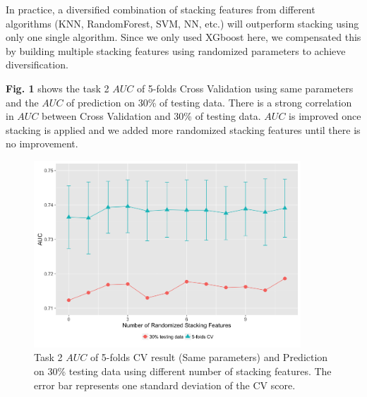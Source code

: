 \documentclass[a4paper]{llncs}
\makeatletter
\def\BState{\State\hskip-\ALG@thistlm}
\makeatother
\begin{document}
In practice, a diversified combination of stacking features from different algorithms (KNN, RandomForest, SVM, NN, etc.)
will outperform stacking using only one single algorithm.
Since we only used XGboost here, we compensated this by building multiple stacking features using randomized parameters to achieve diversification.


\textbf{Fig. 1} shows the task 2 $AUC$ of 5-folds Cross Validation using same parameters and the $AUC$ of prediction on 30\% of testing data.
 There is a strong correlation in $AUC$ between Cross Validation and 30\% of testing data.
 $AUC$ is improved once stacking is applied and we added more randomized stacking features until there is no improvement.

\begin{figure}[ht!]
\centering
\includegraphics[width=100mm]{Rplot.png}
\caption{Task 2 $AUC$ of 5-folds CV result (Same parameters) and Prediction on 30\% testing data using different number of stacking features.
 The error bar represents one standard deviation of the CV score. \label{overflow}}
\end{figure}




\end{document}
